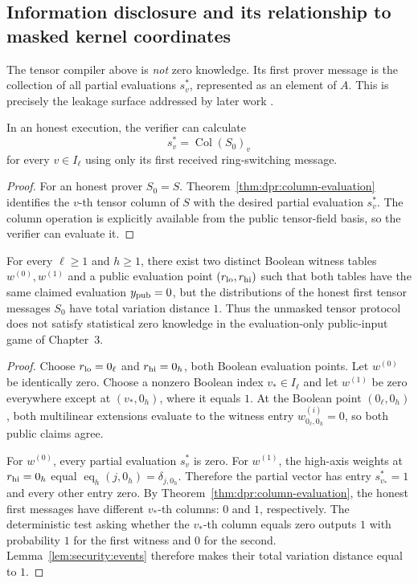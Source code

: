\subsection{Information disclosure and its relationship to masked kernel coordinates}\label{sec:dpr:privacy}

The tensor compiler above is \emph{not}
zero knowledge. Its first prover
message is the collection of all
partial evaluations $s_v^*$,
represented as an element of $A$.
This is precisely the leakage
surface addressed by later work
\cite{Kochergin2026,FrigoShelat2026}.

\begin{lemma}\label{lem:dpr:leaks-partials}
In an honest execution,
the verifier can calculate
\[
 \boxed{s_v^*=\operatorname{Col}(S_0)_v}
\]
for every $v\in I_\ell$
using only its first received
ring-switching message.
\end{lemma}
\begin{proof}
For an honest prover $S_0=S$.
Theorem~\ref{thm:dpr:column-evaluation}
identifies the $v$-th
tensor column of $S$
with the desired partial
evaluation $s_v^*$.
The column operation is
explicitly available from
the public tensor-field basis,
so the verifier can evaluate it.
\end{proof}

\begin{theorem}\label{thm:dpr:not-zk}
For every $\ell\geq1$ and $h\geq1$,
there exist two distinct Boolean
witness tables $w^{(0)},w^{(1)}$
and a public evaluation point
$(r_{\rm lo},r_{\rm hi})$
such that both tables have the same
claimed evaluation $y_{\rm pub}=0$,
but the distributions of the honest
first tensor messages $S_0$
have total variation distance $1$.
Thus the unmasked tensor protocol
does not satisfy statistical
zero knowledge in the
evaluation-only public-input game
of Chapter~3.
\end{theorem}
\begin{proof}
Choose $r_{\rm lo}=0_\ell$
and $r_{\rm hi}=0_h$, both
Boolean evaluation points.
Let $w^{(0)}$ be identically zero.
Choose a nonzero Boolean index
$v_*\in I_\ell$ and let
$w^{(1)}$ be zero everywhere
except at $(v_*,0_h)$,
where it equals $1$.
At the Boolean point
$(0_\ell,0_h)$,
both multilinear extensions
evaluate to the witness entry
$w^{(i)}_{0_\ell,0_h}=0$,
so both public claims agree.

For $w^{(0)}$, every partial
evaluation $s_v^*$ is zero.
For $w^{(1)}$,
the high-axis weights at
$r_{\rm hi}=0_h$ equal
$\operatorname{eq}_h(j,0_h)
=\delta_{j,0_h}$.
Therefore the partial vector
has entry $s_{v_*}^*=1$
and every other entry zero.
By Theorem~\ref{thm:dpr:column-evaluation},
the honest first messages have
different $v_*$-th columns:
$0$ and $1$, respectively.
The deterministic test asking
whether the $v_*$-th column
equals zero outputs $1$
with probability $1$ for the
first witness and $0$ for
the second.
Lemma~\ref{lem:security:events}
therefore makes their total
variation distance equal to $1$.
\end{proof}

